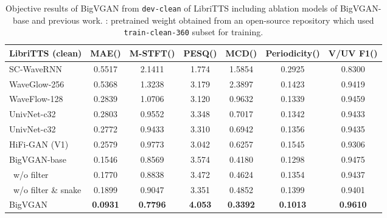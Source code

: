 \documentclass{article} \usepackage{iclr2023_conference,times}
\theoremstyle{plain}
\theoremstyle{definition}
\theoremstyle{remark}
\begin{document}
\begin{table*}[t]
\caption{\footnotesize Objective results of BigVGAN from \texttt{dev-clean} of LibriTTS including ablation models of BigVGAN-base and previous work. : pretrained weight obtained from an open-source repository which used \texttt{train-clean-360} subset for training.}
\label{libritts-numeric-clean}
\vspace{-0.05cm}
\begin{center}
\begin{small}
\begin{adjustbox}{width=0.9\textwidth}
\begin{tabular}{l|cccccc}
\toprule
LibriTTS (clean)  & MAE() & M-STFT() & PESQ() & MCD() & Periodicity() & V/UV F1() \\
\midrule
SC-WaveRNN   & 0.5517 & 2.1411 & 1.774 & 1.5854 & 0.2925 & 0.8300 \\
WaveGlow-256 & 0.5368 & 1.3238 & 3.179 & 2.3897 & 0.1423 & 0.9419 \\
WaveFlow-128 & 0.2839 & 1.0706 & 3.120 & 0.9632 & 0.1339 & 0.9459 \\
UnivNet-c32 & 0.2803 & 0.9552 & 3.348 & 0.7017 & 0.1342 & 0.9433 \\
UnivNet-c32 & 0.2772 & 0.9433 & 3.310 & 0.6942 & 0.1356 & 0.9435 \\
HiFi-GAN (V1) & 0.2579 & 0.9773 & 3.042 & 0.6257 & 0.1545 & 0.9306 \\
\midrule
BigVGAN-base    & 0.1546 & 0.8569 & 3.574 & 0.4180 & 0.1298 & 0.9475 \\
\ w/o filter    & 0.1770 & 0.8838 & 3.472 & 0.4624 & 0.1354 & 0.9437 \\
\ w/o filter \& snake    & 0.1899 & 0.9047 & 3.351 & 0.4852 & 0.1399 & 0.9401\\
\midrule
BigVGAN    & \textbf{0.0931} & \textbf{0.7796} & \textbf{4.053} & \textbf{0.3392} & \textbf{0.1013} & \textbf{0.9610}\\
\bottomrule
\end{tabular}
\end{adjustbox}
\end{small}
\end{center}
\vskip -0.1in
\end{table*}
\end{document}
